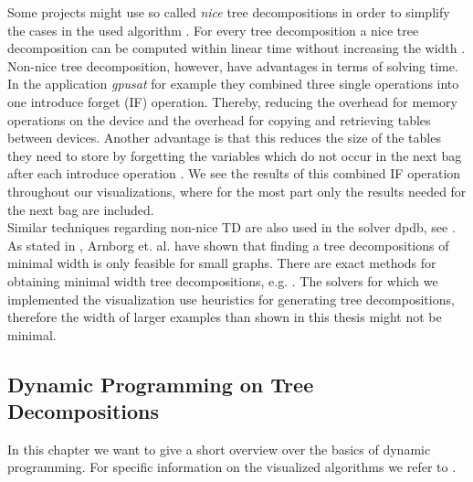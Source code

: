 \documentclass[a4paper, 12pt, bibliography=totoc]{scrartcl}
\begin{document}


\medskip\noindent
Some projects might use so called \textit{nice} tree decompositions in order to simplify the cases in the used algorithm \cite[Ch.~2.2]{DiplomarbeitZisser}.
For every tree decomposition a nice tree decomposition can be computed within linear time without increasing the width \cite{klokstw}.
Non-nice tree decomposition, however, have advantages in terms of solving time. In the application \textit{gpusat} for example they combined three single operations into one introduce forget (IF) operation. Thereby, reducing the overhead for memory operations on the device and the overhead for copying and retrieving tables between devices. Another advantage is that this reduces the size of the tables they need to store by forgetting the variables which do not occur in the next bag after each introduce operation \cite[Ch.~4.2.1]{DiplomarbeitZisser}. 
We see the results of this combined IF operation throughout our visualizations, where for the most part only the results needed for the next bag are included.\\
Similar techniques regarding non-nice TD are also used in the solver dpdb, see \cite[Ch.~4.1]{dpdbpadl2020}.\\

As stated in \cite[Ch.~2.2]{DiplomarbeitZisser}, Arnborg et. al. \cite{arnborgtd} have shown that finding a tree decompositions of minimal width is only feasible for small graphs.  There are exact methods for obtaining minimal width tree decompositions,  e.g. \cite{gogatetw, bachoore06}. The solvers for which we implemented the visualization use heuristics  for  generating tree decompositions, therefore  the width of larger examples than shown in this thesis might not be minimal. 


\subsection{Dynamic Programming on Tree Decompositions}
In this chapter we want to give a short overview over the basics of dynamic programming. For specific information on the visualized algorithms we refer to \cite{DiplomarbeitZisser, samermodelcounting, dpdbpadl2020}. \\
\end{document}
